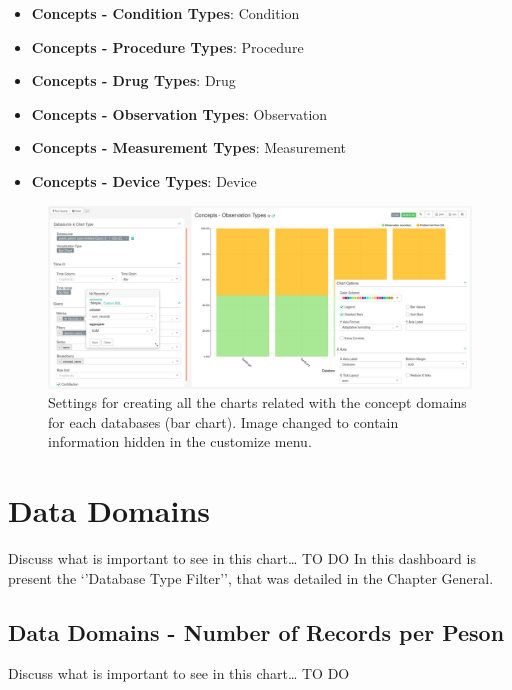 \documentclass[]{book}
\providecommand{\tightlist}{%
  \setlength{\itemsep}{0pt}\setlength{\parskip}{0pt}}
\begin{document}
\begin{itemize}
  \begin{itemize}
  \tightlist
  \item
    \textbf{Concepts - Condition Types}: Condition
  \item
    \textbf{Concepts - Procedure Types}: Procedure
  \item
    \textbf{Concepts - Drug Types}: Drug
  \item
    \textbf{Concepts - Observation Types}: Observation
  \item
    \textbf{Concepts - Measurement Types}: Measurement
  \item
    \textbf{Concepts - Device Types}: Device
  \end{itemize}
\end{itemize}

\begin{figure}
\includegraphics[width=1\linewidth]{images/conceptsDomainTypes} \caption{Settings for creating all the charts related with the concept domains for each databases (bar chart). Image changed to contain information hidden in the customize menu.}\label{fig:conceptsDomainTypes}
\end{figure}

\chapter{Data Domains}\label{data-domains}

Discuss what is important to see in this chart\ldots{} TO DO In this
dashboard is present the `'Database Type Filter'', that was detailed in
the Chapter General.

\section{Data Domains - Number of Records per
Peson}\label{data-domains---number-of-records-per-peson}

Discuss what is important to see in this chart\ldots{} TO DO
\end{document}

